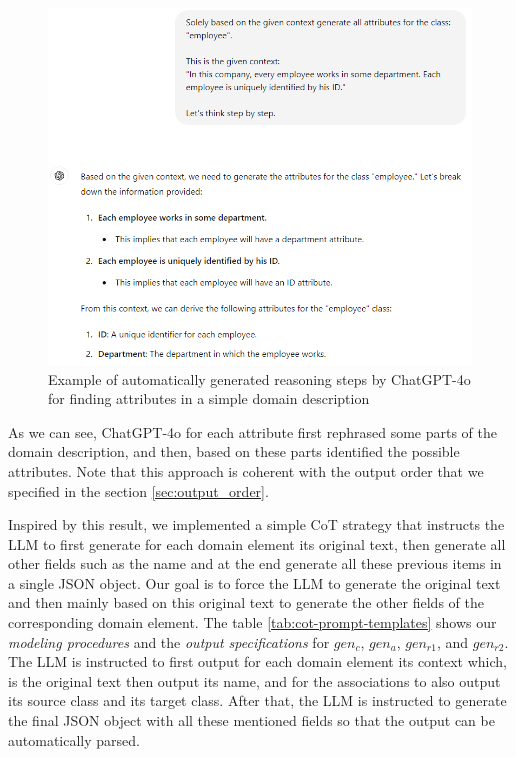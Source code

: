 \begin{figure}[!h]
    \centering
    \includegraphics[scale=0.6]{img/cot-think-step-by-step.png}
    \caption{\centering Example of automatically generated reasoning steps by ChatGPT-4o for finding attributes in a simple domain description}
    \label{fig:cot-think-step-by-step}
\end{figure}

As we can see, ChatGPT-4o for each attribute first rephrased some parts of the domain description, and then, based on these parts identified the possible attributes. Note that this approach is coherent with the output order that we specified in the section \ref{sec:output_order}.

Inspired by this result, we implemented a simple CoT strategy that instructs the LLM to first generate for each domain element its original text, then generate all other fields such as the name and at the end generate all these previous items in a single JSON object. Our goal is to force the LLM to generate the original text and then mainly based on this original text to generate the other fields of the corresponding domain element.
The table \ref{tab:cot-prompt-templates} shows our \emph{modeling procedures} and the \emph{output specifications} for $gen_c$, $gen_a$, $gen_{r1}$, and $gen_{r2}$.
The LLM is instructed to first output for each domain element its context which, is the original text then output its name, and for the associations to also output its source class and its target class. After that, the LLM is instructed to generate the final JSON object with all these mentioned fields so that the output can be automatically parsed.

